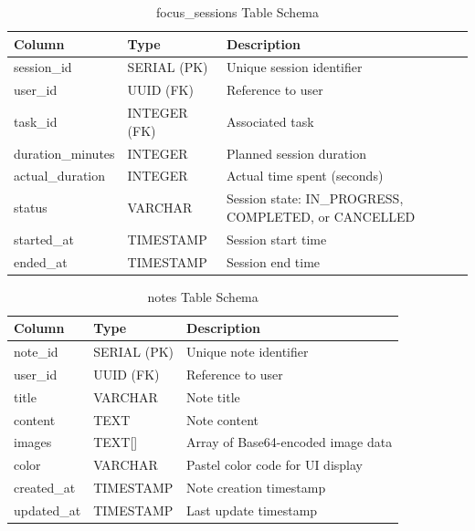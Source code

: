 \begin{table}[htbp]
\centering
\begin{tabular}{|l|l|p{5.5cm}|}
\hline
\textbf{Column} & \textbf{Type} & \textbf{Description} \\
\hline
session\_id & SERIAL (PK) & Unique session identifier \\
user\_id & UUID (FK) & Reference to user \\
task\_id & INTEGER (FK) & Associated task \\
duration\_minutes & INTEGER & Planned session duration \\
actual\_duration & INTEGER & Actual time spent (seconds) \\
status & VARCHAR & Session state: IN\_PROGRESS, COMPLETED, or CANCELLED \\
started\_at & TIMESTAMP & Session start time \\
ended\_at & TIMESTAMP & Session end time \\
\hline
\end{tabular}
\caption{focus\_sessions Table Schema}
\end{table}

\begin{table}[htbp]
\centering
\begin{tabular}{|l|l|l|}
\hline
\textbf{Column} & \textbf{Type} & \textbf{Description} \\
\hline
note\_id & SERIAL (PK) & Unique note identifier \\
user\_id & UUID (FK) & Reference to user \\
title & VARCHAR & Note title \\
content & TEXT & Note content \\
images & TEXT[] & Array of Base64-encoded image data \\
color & VARCHAR & Pastel color code for UI display \\
created\_at & TIMESTAMP & Note creation timestamp \\
updated\_at & TIMESTAMP & Last update timestamp \\
\hline
\end{tabular}
\caption{notes Table Schema}
\end{table}

